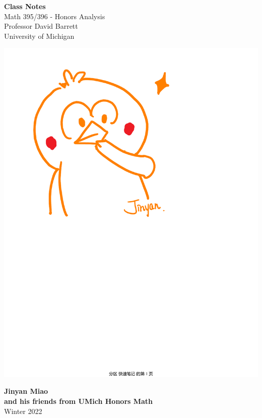 \documentclass[11pt,oneside]{book}
\theoremstyle{break}
\theoremstyle{break}
\begin{document}
	\begin{titlepage}
		\begin{center}
			\vspace*{\fill}
			\Huge \color{red}
				\textbf{Class Notes}\\
				\color{black}
			\vspace{0.5cm}			
			\Large 
				Math 395/396 - Honors Analysis\\
				Professor David Barrett\\	
				University of Michigan\\
			\vspace{3cm}

			\includegraphics[scale=0.57]{hmm.pdf}
			
			
			\vspace{5cm}
			\LARGE
				\textbf{Jinyan Miao}\\
				\large \textbf{and his friends from UMich Honors Math}\\
				\hfill\break
				\LARGE Winter 2022\\
				\color{black}
			\vspace{5cm}

		\vspace*{\fill}
		\author{Jinyan Miao} \date{Winter 2022}
		\end{center}			
	\end{titlepage}
\end{document}
